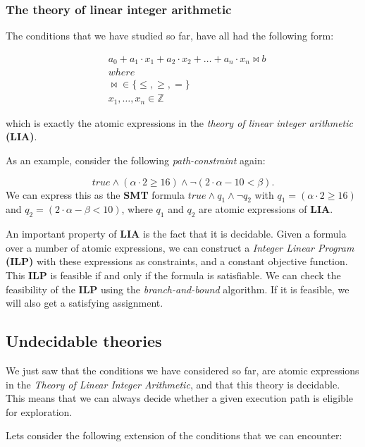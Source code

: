 	\fi
	\subsubsection{The theory of linear integer arithmetic}
		The conditions that we have studied so far, have all had the following form:
		
		\begin{align*}
			& a_0 +  a_1 \cdot x_1 + a_2\cdot x_2 + \ldots + a_n \cdot x_n \bowtie b\\
			& where\\
			& \bowtie \in \{\leq, \geq, =\}\\
			& x_1, \ldots, x_n \in \mathbb{Z}			
		\end{align*}
		
	which is exactly the atomic expressions in the \emph{theory of linear integer arithmetic} \textbf{(LIA)}. 
	
	As an example, consider the following \emph{path-constraint} again:
	
	\begin{equation}
		true \land (\alpha \cdot 2 \geq 16) \land \neg (2\cdot \alpha - 10 < \beta).
	\end{equation}	
	We can express this as the \textbf{SMT} formula $true \land q_1 \land \neg q_2$ with $q_1 = (\alpha \cdot 2 \geq 16)$ and $q_2 = (2\cdot \alpha - \beta < 10)$, where $q_1$ and $q_2$ are atomic expressions of \textbf{LIA}.
	
	An important property of \textbf{LIA} is the fact that it is decidable. Given a formula over a number of atomic expressions, we can construct a \emph{Integer Linear Program} \textbf{(ILP)} with these expressions as constraints, and a constant objective function. This \textbf{ILP} is feasible if and only if the formula is satisfiable. We can check the feasibility of the \textbf{ILP} using the \emph{branch-and-bound} algorithm. If it is feasible, we will also get a satisfying assignment. 
	
	\subsection{Undecidable theories}
	
	We just saw that the conditions we have considered so far, are atomic expressions in the \emph{Theory of Linear Integer Arithmetic}, and that this theory is decidable. This means that we can always decide whether a given execution path is eligible for exploration.
	 
	Lets consider the following extension of the conditions that we can encounter:
	

